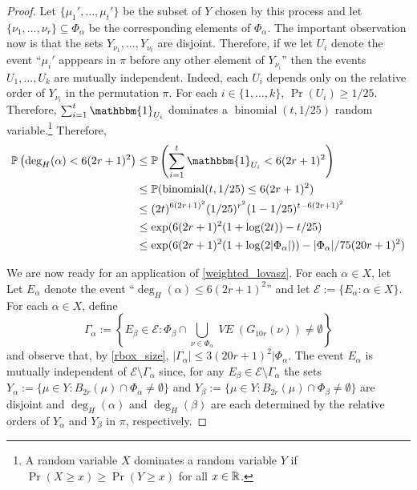 \documentclass{patmorin}
\DeclareMathOperator{\binomial}{binomial}
\DeclareMathOperator{\VE}{\mathit{VE}}
\begin{document}
\begin{proof}
  
  Let $\{\mu_1',\ldots,\mu_t'\}$ be the subset of $Y$ chosen by this process and let $\{\nu_1,\ldots,\nu_r\}\subseteq\Phi_\alpha$ be the corresponding elements of $\Phi_\alpha$.  The important observation now is that the sets $Y_{\nu_1},\ldots,Y_{\nu_t}$ are disjoint.  Therefore, if we let $U_i$ denote the event ``$\mu_i'$ apppears in $\pi$ before any other element of $Y_{\nu_i}$'' then the events $U_1,\ldots,U_k$ are mutually independent.  Indeed, each $U_i$ depends only on the relative order of $Y_{\nu_i}$ in the  permutation $\pi$.  For each $i\in\{1,\ldots,k\}$, $\Pr(U_i)\ge 1/25$.  Therefore, $\sum_{i=1}^t \mathbbm{1}_{U_i}$ dominates a $\binomial(t,1/25)$ random variable.\footnote{A random variable $X$ dominates a random variable $Y$ if $\Pr(X\ge x)\ge \Pr(Y\ge x)$ for all $x\in\mathbb{R}$.}  Therefore,
  \begin{align}
    \Pr\left(\deg_H(\alpha)< 6(2r+1)^2\right) 
    & \le \Pr\left(\sum_{i=1}^t \mathbbm{1}_{U_i} < 6(2r+1)^2\right) \notag \\
    & \le \Pr(\binomial(t,1/25)\le 6(2r+1)^2) \notag \\
    & \le (2t)^{6(2r+1)^2}(1/25)^{r^2}(1-1/25)^{t-6(2r+1)^2} \notag \\
    & \le \exp(6(2r+1)^2(1+\log(2t))-t/25) \notag \\
    & \le \exp(6(2r+1)^2(1+\log(2|\Phi_\alpha|))-|\Phi_\alpha|/75(20r+1)^2) \label{probability}
  \end{align}


  We are now ready for an application of \cref{weighted_lovasz}.  For each $\alpha\in X$, let Let $E_\alpha$ denote the event ``$\deg_H(\alpha)\le 6(2r+1)^2$'' and let $\mathcal{E}:=\{E_\alpha:\alpha\in X\}$. For each $\alpha\in X$, define
  \[
     \Gamma_\alpha := \left\{E_\beta \in \mathcal{E}: \Phi_\beta\cap \bigcup_{\nu\in \Phi_\alpha} \VE(G_{10r}(\nu))\neq\emptyset\right\} 
  \]
  and observe that, by \ref{rbox_size}, $|\Gamma_\alpha|\le 3(20r+1)^2|\Phi_\alpha$.
  The event $E_\alpha$ is mutually independent of $\mathcal{E}\setminus\Gamma_\alpha$ since, for any $E_\beta\in\mathcal{E}\setminus\Gamma_\alpha$ the sets $Y_\alpha:=\{\mu\in Y:B_{2r}(\mu)\cap \Phi_\alpha\neq\emptyset\}$ and $Y_\beta:=\{\mu\in Y:B_{2r}(\mu)\cap \Phi_\beta\neq\emptyset\}$ are disjoint and $\deg_H(\alpha)$ and $\deg_H(\beta)$ are each determined by the relative orders of $Y_\alpha$ and $Y_\beta$ in $\pi$, respectively.


\end{proof}
\end{document}
